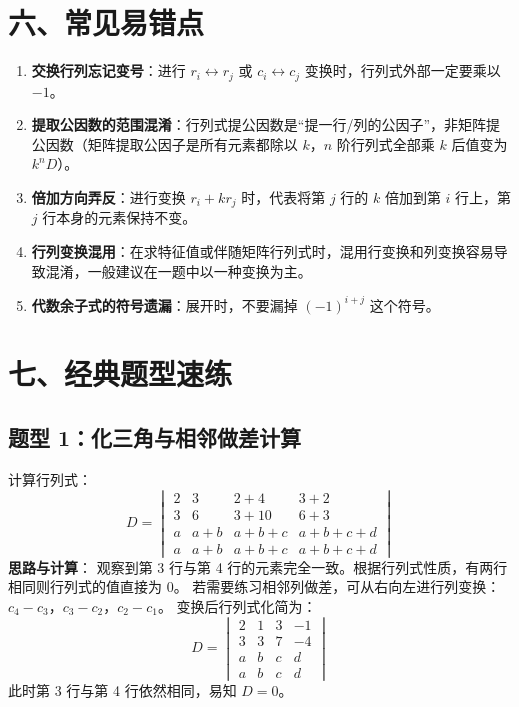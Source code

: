 \documentclass{ctexart}
\begin{document}
\section{六、常见易错点}

\begin{enumerate}
  \item \textbf{交换行列忘记变号}：进行 $r_i \leftrightarrow r_j$ 或 $c_i \leftrightarrow c_j$ 变换时，行列式外部一定要乘以 $-1$。
  \item \textbf{提取公因数的范围混淆}：行列式提公因数是``提一行/列的公因子''，非矩阵提公因数（矩阵提取公因子是所有元素都除以 $k$，$n$ 阶行列式全部乘 $k$ 后值变为 $k^n D$）。
  \item \textbf{倍加方向弄反}：进行变换 $r_i + k r_j$ 时，代表将第 $j$ 行的 $k$ 倍加到第 $i$ 行上，第 $j$ 行本身的元素保持不变。
  \item \textbf{行列变换混用}：在求特征值或伴随矩阵行列式时，混用行变换和列变换容易导致混淆，一般建议在一题中以一种变换为主。
  \item \textbf{代数余子式的符号遗漏}：展开时，不要漏掉 $(-1)^{i+j}$ 这个符号。
\end{enumerate}

\newpage

\section{七、经典题型速练}

\subsection{题型 1：化三角与相邻做差计算}
计算行列式：
\[
D = \begin{vmatrix} 2 & 3 & 2+4 & 3+2 \\ 3 & 6 & 3+10 & 6+3 \\ a & a+b & a+b+c & a+b+c+d \\ a & a+b & a+b+c & a+b+c+d \end{vmatrix}
\]
\textbf{思路与计算}：
观察到第 3 行与第 4 行的元素完全一致。根据行列式性质，有两行相同则行列式的值直接为 $0$。
若需要练习相邻列做差，可从右向左进行列变换：$c_4 - c_3$，$c_3 - c_2$，$c_2 - c_1$。
变换后行列式化简为：
\[
D = \begin{vmatrix} 2 & 1 & 3 & -1 \\ 3 & 3 & 7 & -4 \\ a & b & c & d \\ a & b & c & d \end{vmatrix}
\]
此时第 3 行与第 4 行依然相同，易知 $D=0$。
\end{document}
